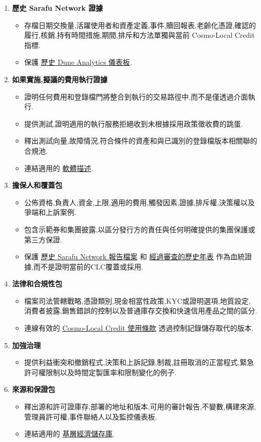 \documentclass[11pt]{article}
\begin{document}
\begin{enumerate}[leftmargin=*]
\item \textbf{歷史 Sarafu Network 證據}
\begin{itemize}[leftmargin=*]
\item 存檔日期交換量,活躍使用者和資產定義,事件,贖回報表,老齡化憑證,確認的履行,核銷,持有時間措施,期間,排斥和方法單獨與當前 Cosmo-Local Credit 指標.
\item 保護 \href{https://dune.com/grassrootseconomics/sarafu-network}{歷史 Dune Analytics 儀表板}.
\end{itemize}
\item \textbf{如果實施,擬議的費用執行證據}
\begin{itemize}[leftmargin=*]
\item 證明任何費用和登錄檔門將整合到執行的交易路徑中,而不是僅透過介面執行.
\item 提供測試,證明適用的執行服務拒絕收到未根據採用政策徵收費的跳蛋.
\item 釋出測試向量,故障情況,符合條件的資產和與已識別的登錄檔版本相關聯的合規池.
\item 連結適用的 \href{https://software.grassecon.org}{軟體描述}.
\end{itemize}
\item \textbf{擔保人和覆蓋包}
\begin{itemize}[leftmargin=*]
\item 公佈資格,負責人,資金,上限,適用的費用,觸發因素,證據,排斥權,決策權以及爭端和上訴案例.
\item 包含示範券和集團披露,以區分發行方的責任與任何明確提供的集團保護或第三方保證.
\item 保護 \href{https://sarafu.network/reports}{歷史 Sarafu Network 報告檔案} 和 \href{https://youtu.be/5yGaP31bvs0?si=fZ-AMTEXsmVR8Ulv}{經過審查的歷史年表} 作為血統證據,而不是證明當前的CLC覆蓋或採用.
\end{itemize}
\item \textbf{法律和合規性包}
\begin{itemize}[leftmargin=*]
\item 檔案司法管轄戰略,憑證類別,現金相當性政策,KYC或證明選項,地質設定,消費者披露,銷售錯誤的控制以及普通庫存交換和快速信用產品之間的區分.
\item 連線有效的 \href{https://docs.cosmolocal.credit/zh-Hant/governance/terms}{Cosmo-Local Credit 使用條款} 透過控制記錄儲存取代的版本.
\end{itemize}
\item \textbf{加強治理}
\begin{itemize}[leftmargin=*]
\item 提供利益衝突和撤銷程式,決策和上訴記錄,制裁,註冊取消的正當程式,緊急許可權限制以及時間定製匯率和限制變化的例子.
\end{itemize}
\item \textbf{來源和保證包}
\begin{itemize}[leftmargin=*]
\item 釋出源和許可證庫存,部署的地址和版本,可用的審計報告,不變數,構建來源,管理員許可權,事件聯絡人以及監控儀表板.
\item 連結適用的 \href{https://github.com/grassrootseconomics}{基層經濟儲存庫}.
\end{itemize}
\end{enumerate}
\end{document}
